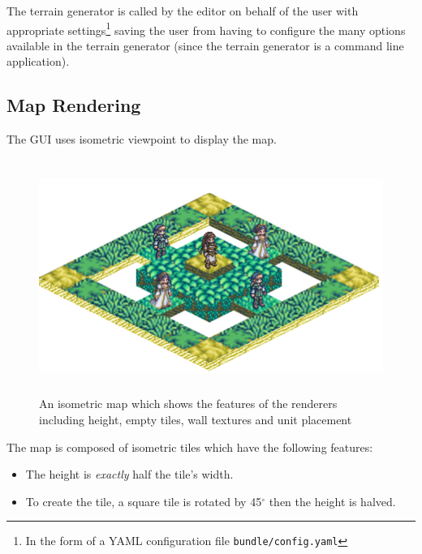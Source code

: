 The terrain generator is called by the editor on behalf of the user with appropriate settings\footnote{In the form of a YAML configuration file \texttt{bundle/config.yaml}} saving the user from having to configure the many options available in the terrain generator (since the terrain generator is a command line application).


\subsection{Map Rendering}
\label{ssub:map_rendering}

The GUI uses isometric viewpoint to display the map. 

\begin{figure}[htbp]
	\centering
		\includegraphics[height=3in]{figures/imp-map.png}
	\caption{An isometric map which shows the features of the renderers including height, empty tiles, wall textures and unit placement}
	\label{fig:figures_imp-map}
\end{figure}

The map is composed of isometric tiles which have the following features:

\begin{itemize}[topsep=0mm,noitemsep ]
	\item  The height is \emph{exactly} half the tile's width.
	\item  To create the tile, a square tile is rotated by 45$^{\circ}$ then the height is halved.
\end{itemize}

